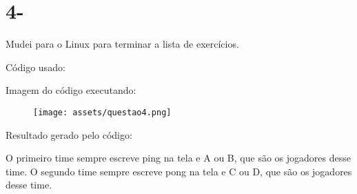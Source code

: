 \section*{4-}

Mudei para o Linux para terminar a lista de exercícios.

Código usado:



Imagem do código executando:

\begin{figure}[h]
    \centering
    \texttt{[image: assets/questao4.png]}
\end{figure}

Resultado gerado pelo código:



O primeiro time sempre escreve ping na tela e A ou B, que são os jogadores desse time.
O segundo time sempre escreve pong na tela e C ou D, que são os jogadores desse time.